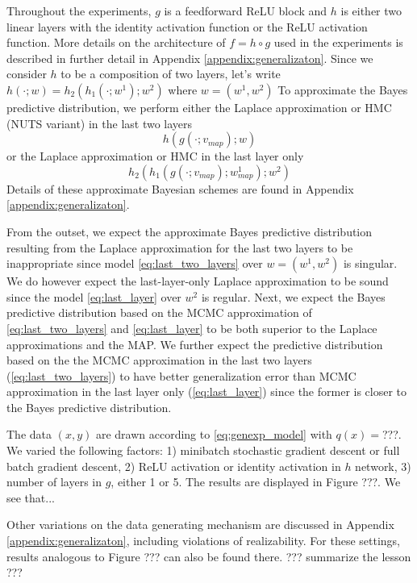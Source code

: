 \documentclass{article} %
\begin{document}
Throughout the experiments, $g$ is a feedforward ReLU block and $h$ is either two linear layers with the identity activation function or the ReLU activation function. More details on the architecture of $f = h \circ g$ used in the experiments is described in further detail in Appendix \ref{appendix:generalizaton}.
Since we consider $h$ to be a composition of two layers, let's write $h(\cdot;w)=h_2( h_1(\cdot; w^1); w^2)$ where $w=(w^1,w^2)$
To approximate the Bayes predictive distribution, we perform either the Laplace approximation or HMC (NUTS variant) \citep{hoffman2014no} in the last two layers  \begin{equation}
h(g(\cdot;v_{map});w)
\label{eq:last_two_layers}
\end{equation}
or the Laplace approximation or HMC in the last layer only 
\begin{equation}
h_2(h_1(g(\cdot;v_{map});w^1_{map}); w^2)
\label{eq:last_layer}
\end{equation}
Details of these approximate Bayesian schemes are found in Appendix \ref{appendix:generalizaton}.

From the outset, we expect the approximate Bayes predictive distribution resulting from the Laplace approximation for the last two layers to be inappropriate since model \eqref{eq:last_two_layers} over $w = (w^1, w^2)$ is singular. We do however expect the last-layer-only Laplace approximation to be sound since the model \eqref{eq:last_layer} over $w^2$ is regular. Next, we expect the Bayes predictive distribution based on the MCMC approximation of \eqref{eq:last_two_layers} and \eqref{eq:last_layer} to be both superior to the Laplace approximations and the MAP. We further expect the predictive distribution based on the the MCMC approximation in the last two layers (\eqref{eq:last_two_layers}) to have better generalization error than MCMC approximation in the last layer only (\eqref{eq:last_layer}) since the former is closer to the Bayes predictive distribution.

The data $(x,y)$ are drawn according to \eqref{eq:genexp_model} with $q(x) =$???. 
We varied the following factors: 1) minibatch stochastic gradient descent or full batch gradient descent, 2) ReLU activation or identity activation in $h$ network, 3) number of layers in $g$, either 1 or 5. 
The results are displayed in Figure ???. We see that...


Other variations on the data generating mechanism are discussed in Appendix \ref{appendix:generalizaton}, including violations of realizability. For these settings, results analogous to Figure ??? can also be found there. ??? summarize the lesson ???
\end{document}
